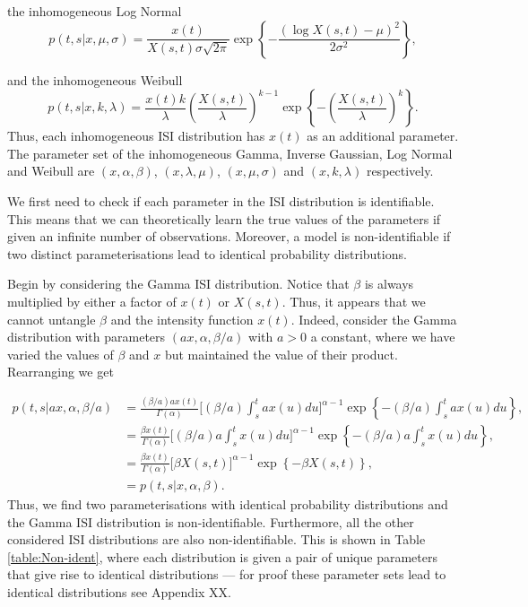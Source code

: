 \documentclass[../main.tex]{subfiles}
\begin{document}
 the inhomogeneous Log Normal 
 $$
  p(t,s| x, \mu, \sigma ) = \frac{x(t)}{X(s,t) \sigma \sqrt{2 \pi}} \exp \left\{ -\frac{(\log X(s,t) - \mu)^2}{2\sigma^2} \right\},
 $$
  
 and the inhomogeneous Weibull
$$
 p(t,s|x,k,\lambda) = \frac{x(t)k}{\lambda} \left( \frac{X(s,t)}{\lambda} \right)^{k-1} \exp \left\{ -\left( \frac{X(s,t)}{\lambda} \right)^k \right\}.
 $$
 Thus, each inhomogeneous ISI distribution has $x(t)$ as an additional parameter. The parameter set of the inhomogeneous Gamma, Inverse Gaussian, Log Normal and Weibull are $(x,\alpha,\beta)$, $(x,\lambda,\mu)$, $(x,\mu,\sigma)$ and $(x,k,\lambda)$ respectively.
     
We first need to check if each parameter in the ISI distribution is identifiable. This means that we can theoretically learn the true values of the parameters if given an infinite number of observations. Moreover, a model is non-identifiable if two distinct parameterisations lead to identical probability distributions. 

Begin by considering the Gamma ISI distribution. Notice that $\beta$ is always multiplied by either a factor of $x(t)$ or $X(s,t)$. Thus, it appears that we cannot untangle $\beta$ and the intensity function $x(t)$.  Indeed, consider the Gamma distribution with parameters $(ax,\alpha,\beta /a)$ with $a>0$ a constant, where we have varied the values of $\beta$ and $x$ but maintained the value of their product. Rearranging we get

 \begin{align*}
 p(t,s|ax, \alpha, \beta/a) &=  \frac{(\beta/a) ax(t)}{\Gamma ( \alpha )} \big[ (\beta/a) \int^t_s a x(u) du \big]^{\alpha -1} \exp\left\{ - (\beta/a) \int^t_s a x(u) du  \right\}, \\
 &=  \frac{\beta x(t)}{\Gamma ( \alpha )} \big[ (\beta/a) a\int^{t}_{s}  x(u) du \big]^{\alpha -1} \exp \left\{ - (\beta/a) a\int^{t}_{s}  x(u) du  \right\}, \\
  &=  \frac{\beta x(t)}{\Gamma ( \alpha )} \big[ \beta X(s,t) \big]^{\alpha -1} \exp\left\{ - \beta X(s,t)  \right\},\\
  &= p(t,s|x, \alpha, \beta).
 \end{align*}
Thus, we find two parameterisations with identical probability distributions and the Gamma ISI distribution is non-identifiable. Furthermore, all the other considered ISI distributions are also non-identifiable. This is shown in Table \ref{table:Non-ident}, where each distribution is given a pair of unique parameters that give rise to identical distributions --- for proof these parameter sets lead to identical distributions see Appendix {\color{red} XX}. 
\end{document}
